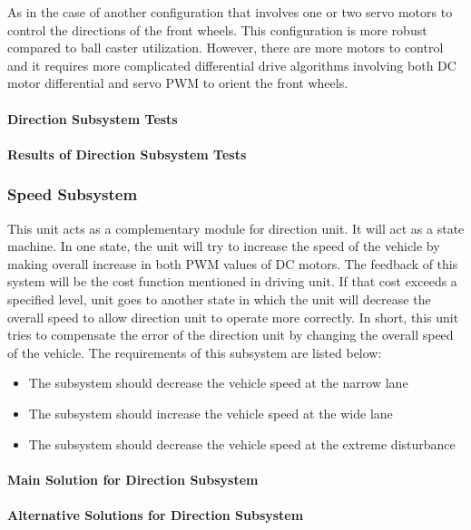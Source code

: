 \documentclass[a4paper,12pt]{article}
\begin{document}
	As in the case of another configuration that involves one or two servo motors to control the directions of the front wheels. This configuration is more robust compared to ball caster utilization. However, there are more motors to control and it requires more complicated differential drive algorithms involving both DC motor differential and servo PWM to orient the front wheels.
	
	\paragraph{Direction Subsystem Tests}
	
	\paragraph{Results of Direction Subsystem Tests}
	
	
	\subsubsection{Speed Subsystem}
	
	This unit acts as a complementary module for direction unit. It will act as a state machine. In one state, the unit will try to increase the speed of the vehicle by making overall increase in both PWM values of DC motors. The feedback of this  system will be the cost function mentioned in driving unit. If that cost exceeds a specified level, unit goes to another state in which the unit will decrease the overall speed to allow direction unit to operate more correctly. In short, this unit tries to compensate the error of the direction unit by changing the overall speed of the vehicle. The requirements of this subsystem are listed below:
	\begin{itemize}
		\item The subsystem should decrease the vehicle speed at the narrow lane 
		\item The subsystem should increase the vehicle speed at the wide lane 
		\item The subsystem should decrease the vehicle speed at the extreme disturbance  
	\end{itemize}
	
	\paragraph{Main Solution for Direction Subsystem}
	
	\paragraph{Alternative Solutions for Direction Subsystem}
	
\end{document}
